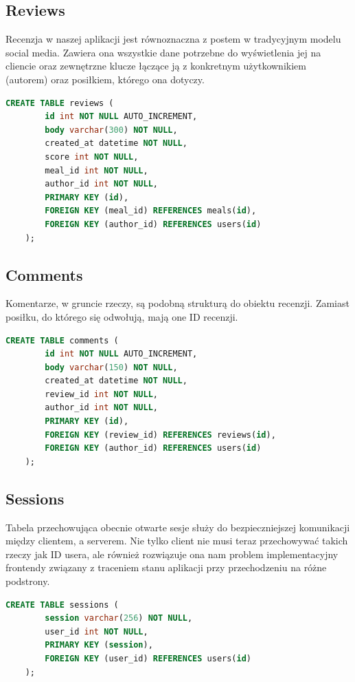 \documentclass{report}
\begin{document}
\subsection*{Reviews}
Recenzja w naszej aplikacji jest równoznaczna z postem w tradycyjnym
modelu social media. Zawiera ona wszystkie dane potrzebne do
wyświetlenia jej na cliencie oraz zewnętrzne klucze łączące ją
z konkretnym użytkownikiem (autorem) oraz posiłkiem, którego ona dotyczy.
\begin{lstlisting}[language=SQL]
    CREATE TABLE reviews (
        id int NOT NULL AUTO_INCREMENT,
        body varchar(300) NOT NULL, 
        created_at datetime NOT NULL, 
        score int NOT NULL, 
        meal_id int NOT NULL, 
        author_id int NOT NULL,
        PRIMARY KEY (id),
        FOREIGN KEY (meal_id) REFERENCES meals(id),
        FOREIGN KEY (author_id) REFERENCES users(id)
    );
\end{lstlisting}

\subsection*{Comments}
Komentarze, w gruncie rzeczy, są podobną strukturą do obiektu recenzji.
Zamiast posiłku, do którego się odwołują, mają one ID recenzji.
\begin{lstlisting}[language=SQL]
    CREATE TABLE comments (
        id int NOT NULL AUTO_INCREMENT, 
        body varchar(150) NOT NULL, 
        created_at datetime NOT NULL, 
        review_id int NOT NULL, 
        author_id int NOT NULL,
        PRIMARY KEY (id),
        FOREIGN KEY (review_id) REFERENCES reviews(id),
        FOREIGN KEY (author_id) REFERENCES users(id)
    );
\end{lstlisting}

\subsection*{Sessions}
Tabela przechowująca obecnie otwarte sesje służy do bezpieczniejszej
komunikacji między clientem, a serverem. Nie tylko client nie musi teraz
przechowywać takich rzeczy jak ID usera, ale również rozwiązuje ona nam
problem implementacyjny frontendy związany z traceniem stanu aplikacji
przy przechodzeniu na różne podstrony. 
\begin{lstlisting}[language=SQL]
    CREATE TABLE sessions (
        session varchar(256) NOT NULL,
        user_id int NOT NULL,
        PRIMARY KEY (session),
        FOREIGN KEY (user_id) REFERENCES users(id)
    );
\end{lstlisting}
\end{document}

